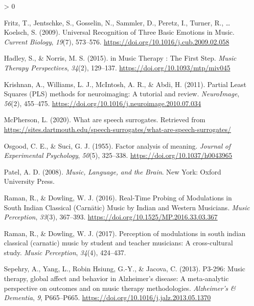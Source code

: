 \documentclass[
  english,
  man]{apa6}
\newlength{\cslhangindent}
\newenvironment{CSLReferences}[2] %
 {%
  \setlength{\parindent}{0pt}
  \ifodd #1 \everypar{\setlength{\hangindent}{\cslhangindent}}\ignorespaces\fi
  \ifnum #2 > 0
  \setlength{\parskip}{#2\baselineskip}
  \fi
 }%
 {}
\begin{document}
\begin{CSLReferences}{1}{0}
\leavevmode\hypertarget{ref-Fritz2009}{}%
Fritz, T., Jentschke, S., Gosselin, N., Sammler, D., Peretz, I., Turner, R., \ldots{} Koelsch, S. (2009). {Universal Recognition of Three Basic Emotions in Music}. \emph{Current Biology}, \emph{19}(7), 573--576. \url{https://doi.org/10.1016/j.cub.2009.02.058}

\leavevmode\hypertarget{ref-Hadley2015}{}%
Hadley, S., \& Norris, M. S. (2015). {in Music Therapy : The First Step}. \emph{Music Therapy Perspectives}, \emph{34}(2), 129--137. \url{https://doi.org/10.1093/mtp/miv045}

\leavevmode\hypertarget{ref-Krishnan2011}{}%
Krishnan, A., Williams, L. J., McIntosh, A. R., \& Abdi, H. (2011). {Partial Least Squares (PLS) methods for neuroimaging: A tutorial and review}. \emph{NeuroImage}, \emph{56}(2), 455--475. \url{https://doi.org/10.1016/j.neuroimage.2010.07.034}

\leavevmode\hypertarget{ref-McPherson2020a}{}%
McPherson, L. (2020). {What are speech surrogates}. Retrieved from \url{https://sites.dartmouth.edu/speech-surrogates/what-are-speech-surrogates/}

\leavevmode\hypertarget{ref-Osgood1955}{}%
Osgood, C. E., \& Suci, G. J. (1955). {Factor analysis of meaning}. \emph{Journal of Experimental Psychology}, \emph{50}(5), 325--338. \url{https://doi.org/10.1037/h0043965}

\leavevmode\hypertarget{ref-Patel2008}{}%
Patel, A. D. (2008). \emph{{Music, Language, and the Brain}}. New York: Oxford University Press.

\leavevmode\hypertarget{ref-Raman2016}{}%
Raman, R., \& Dowling, W. J. (2016). {Real-Time Probing of Modulations in South Indian Classical (Carnātic) Music by Indian and Western Musicians}. \emph{Music Perception}, \emph{33}(3), 367--393. \url{https://doi.org/10.1525/MP.2016.33.03.367}

\leavevmode\hypertarget{ref-Raman2017}{}%
Raman, R., \& Dowling, W. J. (2017). {Perception of modulations in south indian classical (carnatic) music by student and teacher musicians: A cross-cultural study}. \emph{Music Perception}, \emph{34}(4), 424--437.

\leavevmode\hypertarget{ref-Sepehry2013}{}%
Sepehry, A., Yang, L., Robin Hsiung, G.-Y., \& Jacova, C. (2013). {P3-296: Music therapy, global affect and behavior in Alzheimer's disease: A meta-analytic perspective on outcomes and on music therapy methodologies}. \emph{Alzheimer's {\&} Dementia}, \emph{9}, P665--P665. \url{https://doi.org/10.1016/j.jalz.2013.05.1370}


\end{CSLReferences}
\end{document}
